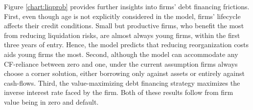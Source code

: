 \documentclass[12pt]{article}
\begin{document}
Figure \ref{chart:liqprob} provides further insights into firms' debt financing frictions. First, even though age is not explicitly considered in the model, firms' lifecycle affects their credit conditions. Small but productive firms, who benefit the most from reducing liquidation risks, are almost always young firms, within the first three years of entry. Hence, the model predicts that reducing reorganization costs aids young firms the most. Second, although the model can accommodate any CF-reliance between zero and one, under the current assumption firms always choose a corner solution, either borrowing only against assets or entirely against cash-flows. Third, the value-maximizing debt financing strategy maximizes the inverse interest rate faced by the firm. Both of these results follow from firm value being in zero and default. 
\end{document}
